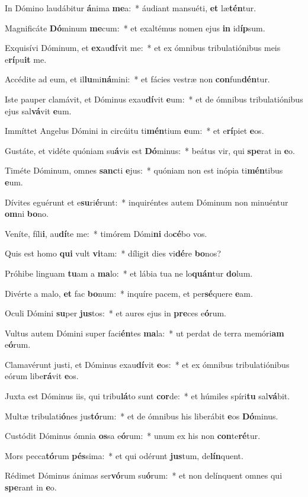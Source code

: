 \item In Dómino laudábitur \textbf{á}nima \textbf{me}a:~* áudiant mansuéti, \textbf{et} læ\textbf{tén}tur.
\item Magnificáte \textbf{Dó}minum \textbf{me}cum:~* et exaltémus nomen ejus \textbf{in} id\textbf{íp}sum.
\item Exquisívi Dóminum, et \textbf{ex}au\textbf{dí}vit me:~* et ex ómnibus tribulatiónibus meis e\textbf{rí}pu\textbf{it} me.
\item Accédite ad eum, et il\textbf{lu}mi\textbf{ná}mini:~* et fácies vestræ non \textbf{con}fun\textbf{dén}tur.
\item Iste pauper clamávit, et Dóminus exau\textbf{dí}vit \textbf{e}um:~* et de ómnibus tribulatiónibus ejus sal\textbf{vá}vit \textbf{e}um.
\item Immíttet Angelus Dómini in circúitu ti\textbf{mén}tium \textbf{e}um:~* et e\textbf{rí}piet \textbf{e}os.
\item Gustáte, et vidéte quóniam su\textbf{á}vis est \textbf{Dó}minus:~* beátus vir, qui \textbf{spe}rat in \textbf{e}o.
\item Timéte Dóminum, omnes \textbf{sanc}ti \textbf{e}jus:~* quóniam non est inópia ti\textbf{mén}tibus \textbf{e}um.
\item Dívites eguérunt et e\textbf{su}ri\textbf{é}runt:~* inquiréntes autem Dóminum non minuéntur \textbf{om}ni \textbf{bo}no.
\item Veníte, fíli\textbf{i}, au\textbf{dí}te me:~* timórem Dómi\textbf{ni} do\textbf{cé}bo vos.
\item Quis est homo \textbf{qui} vult \textbf{vi}tam:~* díligit dies vi\textbf{dé}re \textbf{bo}nos?
\item Próhibe linguam \textbf{tu}am a \textbf{ma}lo:~* et lábia tua ne lo\textbf{quán}tur \textbf{do}lum.
\item Divérte a malo, \textbf{et} fac \textbf{bo}num:~* inquíre pacem, et per\textbf{sé}quere \textbf{e}am.
\item Oculi Dómini \textbf{su}per \textbf{jus}tos:~* et aures ejus in \textbf{pre}ces e\textbf{ó}rum.
\item Vultus autem Dómini super faci\textbf{én}tes \textbf{ma}la:~* ut perdat de terra memóri\textbf{am} e\textbf{ó}rum.
\item Clamavérunt justi, et Dóminus exau\textbf{dí}vit \textbf{e}os:~* et ex ómnibus tribulatiónibus eórum libe\textbf{rá}vit \textbf{e}os.
\item Juxta est Dóminus iis, qui tribu\textbf{lá}to sunt \textbf{cor}de:~* et húmiles spíri\textbf{tu} sal\textbf{vá}bit.
\item Multæ tribulati\textbf{ó}nes jus\textbf{tó}rum:~* et de ómnibus his liberábit \textbf{e}os \textbf{Dó}minus.
\item Custódit Dóminus ómnia \textbf{os}sa e\textbf{ó}rum:~* unum ex his non \textbf{con}te\textbf{ré}tur.
\item Mors pecca\textbf{tó}rum \textbf{pés}sima:~* et qui odérunt \textbf{jus}tum, de\textbf{lín}quent.
\item Rédimet Dóminus ánimas ser\textbf{vó}rum su\textbf{ó}rum:~* et non delínquent omnes qui \textbf{spe}rant in \textbf{e}o.
